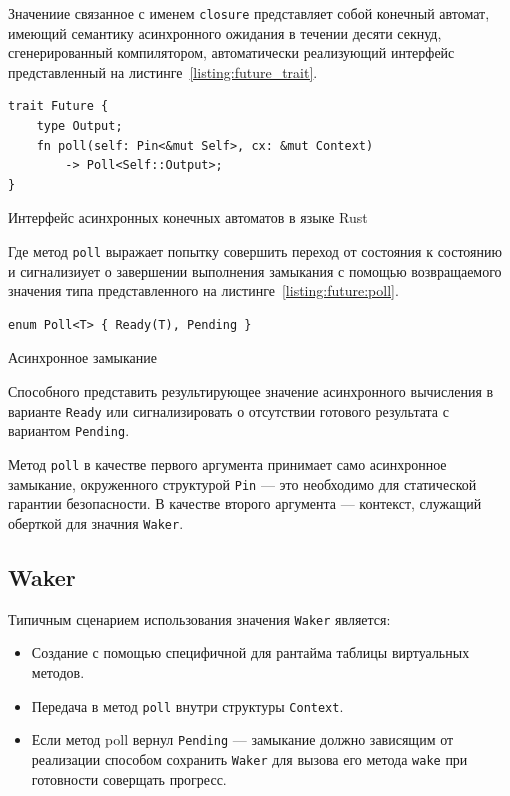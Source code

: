 Значениие связанное с именем \verb|closure| представляет собой конечный автомат, имеющий семантику асинхронного ожидания в течении десяти секнуд, сгенерированный компилятором, автоматически реализующий интерфейс представленный на листинге~\ref{listing:future_trait}.

\begin{listing}[H]
    \begin{verbatim}
trait Future {
    type Output;
    fn poll(self: Pin<&mut Self>, cx: &mut Context)
        -> Poll<Self::Output>;
}
    \end{verbatim}

    \caption{Интерфейс асинхронных конечных автоматов в языке Rust}
    \label{listing:future_trait}
\end{listing}

Где метод \verb|poll| выражает попытку совершить переход от состояния к состоянию и сигнализиует о завершении выполнения замыкания с помощью возвращаемого значения типа представленного на листинге~\ref{listing:future:poll}.

\begin{listing}[H]
    \begin{verbatim}
enum Poll<T> { Ready(T), Pending }
    \end{verbatim}

    \caption{Асинхронное замыкание}
    \label{listing:future:poll}
\end{listing}

Способного представить результирующее значение асинхронного вычисления в варианте \verb|Ready| или сигнализировать о отсутствии готового результата с вариантом \verb|Pending|.

Метод \verb|poll| в качестве первого аргумента принимает само асинхронное замыкание, окруженного структурой \verb|Pin| --- это необходимо для статической гарантии безопасности. В качестве второго аргумента --- контекст, служащий оберткой для значния \verb|Waker|.

\subsection{Waker}

Типичным сценарием использования значения \verb|Waker| является:

\begin{itemize}
    \item Создание с помощью специфичной для рантайма таблицы виртуальных методов.
    \item Передача в метод \verb|poll| внутри структуры \verb|Context|.
    \item Если метод poll вернул \verb|Pending| --- замыкание должно зависящим от реализации способом сохранить \verb|Waker| для вызова его метода \verb|wake| при готовности соверщать прогресс.
\end{itemize}

